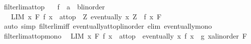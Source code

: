 \begin{isabellebody}
\endisatagproof
{\isafoldproof}%
%
\isadelimproof
%
\endisadelimproof
%
\isadelimdocument
%
\endisadelimdocument
%
\isatagdocument
%
\isamarkuptrue%
%
\endisatagdocument
{\isafolddocument}%
%
\isadelimdocument
%
\endisadelimdocument
{}\isamarkupfalse%
\ filterlim{\isacharunderscore}{\kern0pt}at{\isacharunderscore}{\kern0pt}top{\isacharcolon}{\kern0pt}\isanewline
\ \ \ f\ {\isacharcolon}{\kern0pt}{\isacharcolon}{\kern0pt}\ {\isachardoublequoteopen}{\isacharprime}{\kern0pt}a\ {\isasymRightarrow}\ {\isacharparenleft}{\kern0pt}{\isacharprime}{\kern0pt}b{\isacharcolon}{\kern0pt}{\isacharcolon}{\kern0pt}linorder{\isacharparenright}{\kern0pt}{\isachardoublequoteclose}\isanewline
\ \ \ {\isachardoublequoteopen}{\isacharparenleft}{\kern0pt}LIM\ x\ F{\isachardot}{\kern0pt}\ f\ x\ {\isacharcolon}{\kern0pt}{\isachargreater}{\kern0pt}\ at{\isacharunderscore}{\kern0pt}top{\isacharparenright}{\kern0pt}\ {\isasymlongleftrightarrow}\ {\isacharparenleft}{\kern0pt}{\isasymforall}Z{\isachardot}{\kern0pt}\ eventually\ {\isacharparenleft}{\kern0pt}{\isasymlambda}x{\isachardot}{\kern0pt}\ Z\ {\isasymle}\ f\ x{\isacharparenright}{\kern0pt}\ F{\isacharparenright}{\kern0pt}{\isachardoublequoteclose}\isanewline
%
\isadelimproof
\ \ %
\endisadelimproof
%
\isatagproof
{}\isamarkupfalse%
\ {\isacharparenleft}{\kern0pt}auto\ simp{\isacharcolon}{\kern0pt}\ filterlim{\isacharunderscore}{\kern0pt}iff\ eventually{\isacharunderscore}{\kern0pt}at{\isacharunderscore}{\kern0pt}top{\isacharunderscore}{\kern0pt}linorder\ elim{\isacharbang}{\kern0pt}{\isacharcolon}{\kern0pt}\ eventually{\isacharunderscore}{\kern0pt}mono{\isacharparenright}{\kern0pt}%
\endisatagproof
{\isafoldproof}%
%
\isadelimproof
\isanewline
%
\endisadelimproof
\isanewline
{}\isamarkupfalse%
\ filterlim{\isacharunderscore}{\kern0pt}at{\isacharunderscore}{\kern0pt}top{\isacharunderscore}{\kern0pt}mono{\isacharcolon}{\kern0pt}\isanewline
\ \ {\isachardoublequoteopen}LIM\ x\ F{\isachardot}{\kern0pt}\ f\ x\ {\isacharcolon}{\kern0pt}{\isachargreater}{\kern0pt}\ at{\isacharunderscore}{\kern0pt}top\ {\isasymLongrightarrow}\ eventually\ {\isacharparenleft}{\kern0pt}{\isasymlambda}x{\isachardot}{\kern0pt}\ f\ x\ {\isasymle}\ {\isacharparenleft}{\kern0pt}g\ x{\isacharcolon}{\kern0pt}{\isacharcolon}{\kern0pt}{\isacharprime}{\kern0pt}a{\isacharcolon}{\kern0pt}{\isacharcolon}{\kern0pt}linorder{\isacharparenright}{\kern0pt}{\isacharparenright}{\kern0pt}\ F\ {\isasymLongrightarrow}\isanewline

\end{isabellebody}
